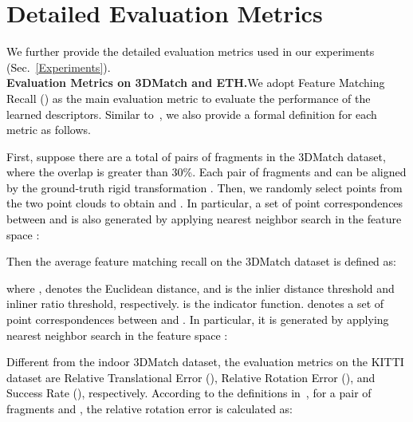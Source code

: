 \documentclass[final]{cvpr}
\newcommand{\qysupp}[1]{\textcolor{black}{#1}}
\begin{document}
\section{Detailed Evaluation Metrics}
\qysupp{We further provide the detailed evaluation metrics used in our experiments (Sec.~\ref{Experiments}).}
\medskip\\
{\bf Evaluation Metrics on 3DMatch and ETH.}\quad \qysupp{We adopt Feature Matching Recall () as the main evaluation metric to evaluate the performance of the learned descriptors. Similar to~\cite{choi2015robust,Deng2018,Deng2018a,choy2019fully}, we also provide a formal definition for each metric as follows.}

\qysupp{First, suppose there are a total of  pairs of fragments in the 3DMatch dataset, where the overlap is greater than 30\%. Each pair of fragments  and  can be aligned by the ground-truth rigid transformation . Then, we randomly select  points from the two point clouds to obtain  and . In particular, a set of point correspondences  between  and  is also generated by applying nearest neighbor search  in the feature space :
}

\qysupp{Then the average feature matching recall on the 3DMatch dataset is defined as:}


\noindent \qysupp{where ,  denotes the Euclidean distance,  
and  is the inlier distance threshold and inliner ratio threshold, respectively.  is the indicator function.  denotes a set of point correspondences between  and . In particular, it is generated by applying nearest neighbor search  in the feature space :}


\begin{comment}
\qysupp{Accordingly, inlier ratio  is defined as:}


\qysupp{Different from FMR and IR metrics, which are mainly used to evaluate the quality of matching pairs, the registration recall is introduced to evaluate the performance of descriptors in an entire registration pipeline. }

\qysupp{where  is a set of  ground-truth corresponding points between  and , and  is the rigid transformation matrix estimated by using RANSAC~\cite{fischler1981random}.  is the Mean Squared Error (MSE) threshold. Following~\cite{bai2020d3feat}, we perform up to 50,000 iterations on the initial correspondence set in our experiment to estimate the rigid transformations, and set the MSE threshold to 0.2.}
\end{comment}


\quad \qysupp{Different from the indoor 3DMatch dataset, the evaluation metrics on the KITTI dataset are Relative Translational Error (), Relative Rotation Error (), and Success Rate (), respectively. According to the definitions in~\cite{ma2016fast,Yew2018,choy2019fully}, for a pair of fragments  and , the relative rotation error  is calculated as:}
\end{document}

